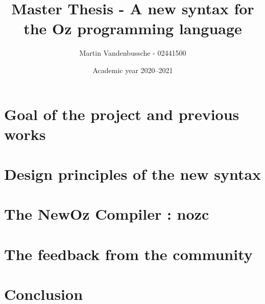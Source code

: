 \documentclass[a4paper,11pt]{scrreprt}
\title{Master Thesis - A new syntax for the Oz programming language}
\author{Martin Vandenbussche - 02441500}
\date{Academic year 2020--2021}
\begin{document}
\maketitle



\begin{comment}
Section 1.1 Contexte et problème
Section 1.2: Inspirations
1.2.1: Scala
1.2.2 Ozma
1.2.3 Jean-Pacifique
Section 1.3 Contributions
1.3.1 Adaptation du travail Jean-Pacifique
1.3.2 NewOz compiler
1.3.3 Community feedback
Section 1.4 Final conclusion on new syntax

chap 2 -> Design principles + my april syntax

chap 3 -> nozc compiler

chap 4 -> community feedback
Comprend  une conclusion qui donne une syntaxe newOz finale avec ton expérience y compris feedback de la communauté

chap 5 -> résumé du processus complet

Appendices : grammar, translations exmaples of Oz to NewOz, tutorial/doc from GitHub
\end{comment}

\tableofcontents


\chapter{Goal of the project and previous works}\label{ch:1}


\chapter{Design principles of the new syntax}\label{ch:2}


\chapter{The NewOz Compiler : nozc}\label{ch:3}


\chapter{The feedback from the community}\label{ch:4}


\chapter{Conclusion}\label{ch:5}

\end{document}
